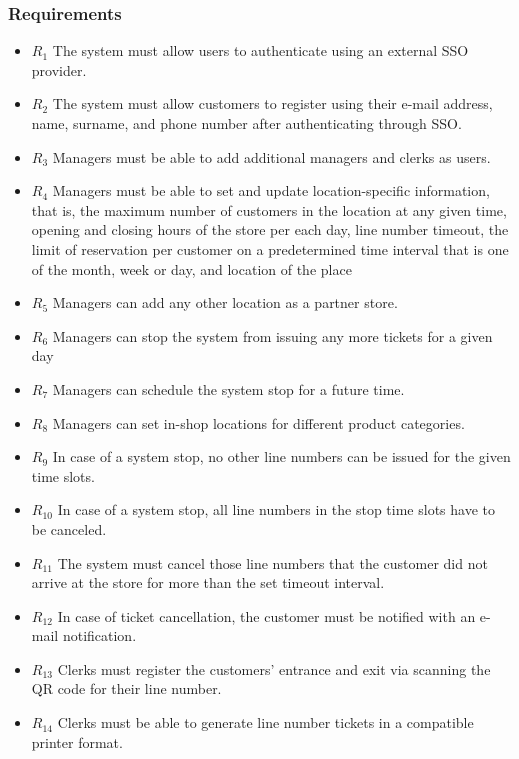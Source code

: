 \subsubsection{Requirements}
\begin{itemize}
    \item \textbf{$R_{1}$} The system must allow users to authenticate using an external SSO provider.
    \item \textbf{$R_{2}$} The system must allow customers to register using their e-mail address, name, surname, and phone number after authenticating through SSO.
    \item \textbf{$R_{3}$} Managers must be able to add additional managers and clerks as users.
    \item \textbf{$R_{4}$} Managers must be able to set and update location-specific information, that is, the maximum number of customers in the location at any given time, opening and closing hours of the store per each day, line number timeout, the limit of reservation per customer on a predetermined time interval that is one of the month, week or day, and location of the place %
    \item \textbf{$R_{5}$} Managers can add any other location as a partner store.
    \item \textbf{$R_{6}$} Managers can stop the system from issuing any more tickets for a given day
    \item \textbf{$R_{7}$} Managers can schedule the system stop for a future time.
    \item \textbf{$R_{8}$} Managers can set in-shop locations for different product categories.
    \item \textbf{$R_{9}$} In case of a system stop, no other line numbers can be issued for the given time slots.
    \item \textbf{$R_{10}$} In case of a system stop, all line numbers in the stop time slots have to be canceled.
    \item \textbf{$R_{11}$} The system must cancel those line numbers that the customer did not arrive at the store for more than the set timeout interval.
    \item \textbf{$R_{12}$} In case of ticket cancellation, the customer must be notified with an e-mail notification.
    \item \textbf{$R_{13}$} Clerks must register the customers' entrance and exit via scanning the QR code for their line number.
    \item \textbf{$R_{14}$} Clerks must be able to generate line number tickets in a compatible printer format.

\end{itemize}
